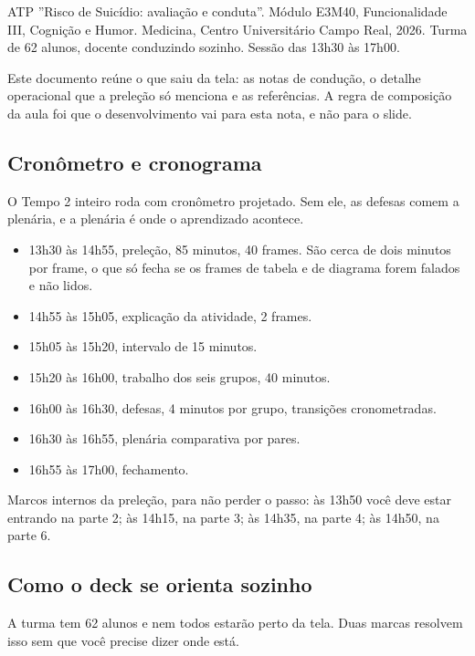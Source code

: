 ATP ''Risco de Suicídio: avaliação e conduta''. Módulo E3M40, Funcionalidade III, Cognição e Humor. Medicina, Centro Universitário Campo Real, 2026. Turma de 62 alunos, docente conduzindo sozinho. Sessão das 13h30 às 17h00.

Este documento reúne o que saiu da tela: as notas de condução, o detalhe operacional que a preleção só menciona e as referências. A regra de composição da aula foi que o desenvolvimento vai para esta nota, e não para o slide.

\filete

\subsection*{Cronômetro e cronograma}

O Tempo 2 inteiro roda com cronômetro projetado. Sem ele, as defesas comem a plenária, e a plenária é onde o aprendizado acontece.

\begin{itemize}[leftmargin=1.1em, itemsep=0.18em, topsep=0.30em]
  \item 13h30 às 14h55, preleção, 85 minutos, 40 frames. São cerca de dois minutos por frame, o que só fecha se os frames de tabela e de diagrama forem falados e não lidos.
  \item 14h55 às 15h05, explicação da atividade, 2 frames.
  \item 15h05 às 15h20, intervalo de 15 minutos.
  \item 15h20 às 16h00, trabalho dos seis grupos, 40 minutos.
  \item 16h00 às 16h30, defesas, 4 minutos por grupo, transições cronometradas.
  \item 16h30 às 16h55, plenária comparativa por pares.
  \item 16h55 às 17h00, fechamento.
\end{itemize}

Marcos internos da preleção, para não perder o passo: às 13h50 você deve estar entrando na parte 2; às 14h15, na parte 3; às 14h35, na parte 4; às 14h50, na parte 6.

\filete

\subsection*{Como o deck se orienta sozinho}

A turma tem 62 alunos e nem todos estarão perto da tela. Duas marcas resolvem isso sem que você precise dizer onde está.


